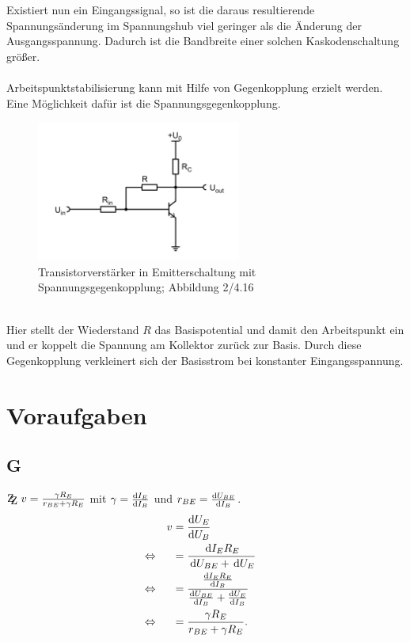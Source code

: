 \documentclass[a4paper,10pt]{article}
\newcommand{\td}{\,\text{d}}
\newcommand{\zz}{\mathrm{Z\kern-.3em\raise-0.5ex\hbox{Z} }}
\numberwithin{equation}{section}
\begin{document}
\begin{multicols}{2}
        Existiert nun ein Eingangssignal, so ist die daraus resultierende Spannungsänderung im Spannungshub viel geringer als die Änderung der Ausgangsspannung.
        Dadurch ist die Bandbreite einer solchen Kaskodenschaltung größer.
        \\\\Arbeitspunktstabilisierung kann mit Hilfe von Gegenkopplung erzielt werden.
        Eine Möglichkeit dafür ist die Spannungsgegenkopplung.
        \begin{figure}[h]
                \centering
                \includegraphics[width=0.6\textwidth]{spannungsgegenkopplung.png}
                \caption{Transistorverstärker in Emitterschaltung mit Spannungsgegenkopplung; Abbildung 2/4.16 \cite{Praktikumsanleitung}}
                \vspace{100cm}
        \end{figure}\\
        Hier stellt der Wiederstand $R$ das Basispotential und damit den Arbeitspunkt ein und er koppelt die Spannung am Kollektor zurück zur Basis.
        Durch diese Gegenkopplung verkleinert sich der Basisstrom bei konstanter Eingangsspannung.

        \newpage
        \section{Voraufgaben}
        \subsection{G}
        $\zz\ v=\tfrac{\gamma R_E}{r_{BE}+\gamma R_E}$ mit $\gamma =\diff[]{I_E}{I_B}$ und $r_{BE}=\diff[]{U_{BE}}{I_B}$.
        \begin{align} 
                && v &= \diff[]{U_E}{U_B} &&\\
                \Leftrightarrow && &= \dfrac{\td I_ER_E}{\td U_{BE}+\td U_E} &&\nonumber \\
                \Leftrightarrow && &= \dfrac{\diff[]{I_ER_E}{I_B}}{\diff[]{U_{BE}}{I_B}+\diff[]{U_E}{I_B}} &&\nonumber \\
                \Leftrightarrow && &= \dfrac{\gamma R_E}{r_{BE}+\gamma R_E}. &&
        \end{align} 


\end{multicols}
\end{document}
